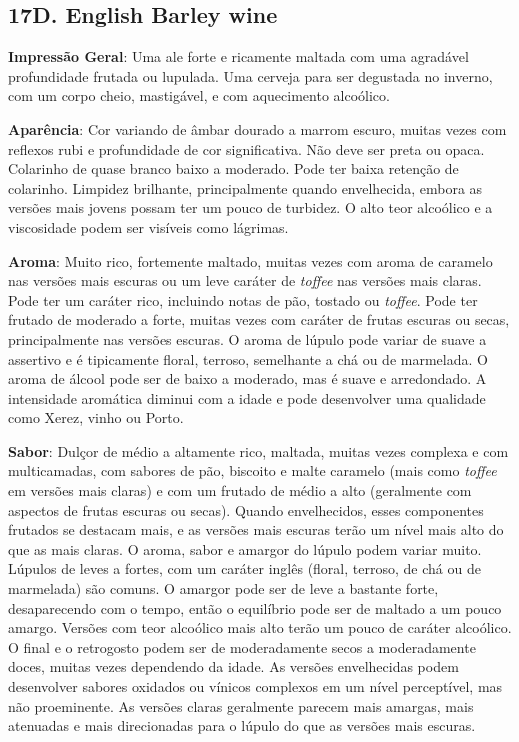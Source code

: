 \subsection*{17D. English Barley wine}
\textbf{Impressão Geral}: Uma ale forte e ricamente maltada com uma agradável profundidade frutada ou lupulada. Uma cerveja para ser degustada no inverno, com um corpo cheio, mastigável, e com aquecimento alcoólico.

\textbf{Aparência}: Cor variando de âmbar dourado a marrom escuro, muitas vezes com reflexos rubi e profundidade de cor significativa. Não deve ser preta ou opaca. Colarinho de quase branco baixo a moderado. Pode ter baixa retenção de colarinho. Limpidez brilhante, principalmente quando envelhecida, embora as versões mais jovens possam ter um pouco de turbidez. O alto teor alcoólico e a viscosidade podem ser visíveis como lágrimas.

\textbf{Aroma}: Muito rico, fortemente maltado, muitas vezes com aroma de caramelo nas versões mais escuras ou um leve caráter de \textit{toffee} nas versões mais claras. Pode ter um caráter rico, incluindo notas de pão, tostado ou \textit{toffee}. Pode ter frutado de moderado a forte, muitas vezes com caráter de frutas escuras ou secas, principalmente nas versões escuras. O aroma de lúpulo pode variar de suave a assertivo e é tipicamente floral, terroso, semelhante a chá ou de marmelada. O aroma de álcool pode ser de baixo a moderado, mas é suave e arredondado. A intensidade aromática diminui com a idade e pode desenvolver uma qualidade como Xerez, vinho ou Porto.

\textbf{Sabor}: Dulçor de médio a altamente rico, maltada, muitas vezes complexa e com multicamadas, com sabores de pão, biscoito e malte caramelo (mais como \textit{toffee} em versões mais claras) e com um frutado de médio a alto (geralmente com aspectos de frutas escuras ou secas). Quando envelhecidos, esses componentes frutados se destacam mais, e as versões mais escuras terão um nível mais alto do que as mais claras. O aroma, sabor e amargor do lúpulo podem variar muito. Lúpulos de leves a fortes, com um caráter inglês (floral, terroso, de chá ou de marmelada) são comuns. O amargor pode ser de leve a bastante forte, desaparecendo com o tempo, então o equilíbrio pode ser de maltado a um pouco amargo. Versões com teor alcoólico mais alto terão um pouco de caráter alcoólico. O final e o retrogosto podem ser de moderadamente secos a moderadamente doces, muitas vezes dependendo da idade. As versões envelhecidas podem desenvolver sabores oxidados ou vínicos complexos em um nível perceptível, mas não proeminente. As versões claras geralmente parecem mais amargas, mais atenuadas e mais direcionadas para o lúpulo do que as versões mais escuras.

